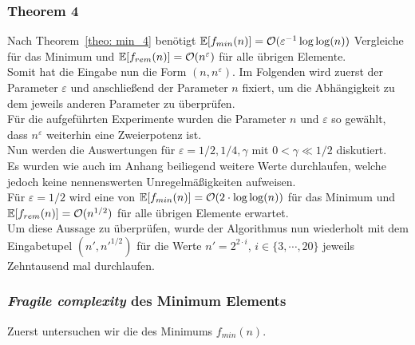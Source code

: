 \subsubsection{Theorem 4}		%

\noindent
Nach Theorem~\ref{theo: min_4} benötigt \Rm $\mathbb{E}[f_{min}(n)]=\mathcal{O}(\varepsilon^{-1}\log\log(n))$ Vergleiche für das Minimum und $\mathbb{E}[f_{rem}(n)]=\mathcal{O}(n^{\varepsilon})$ für alle übrigen Elemente.\\[.1cm]
Somit hat die Eingabe nun die Form $(n, n^{\varepsilon})$. Im Folgenden wird zuerst der Parameter $\varepsilon$ und anschließend der Parameter $n$ fixiert, um die Abhängigkeit zu dem jeweils anderen Parameter zu überprüfen.\\
Für die aufgeführten Experimente wurden die Parameter $n$ und $\varepsilon$ so gewählt, dass $n^{\varepsilon}$ weiterhin eine Zweierpotenz ist.\\[.15cm]

\noindent
Nun werden die Auswertungen für $\varepsilon=1/2, 1/4,\gamma$ mit $0<\gamma\ll 1/2$ diskutiert.\\
Es wurden wie auch im Anhang beiliegend weitere Werte durchlaufen, welche jedoch keine nennenswerten Unregelmäßigkeiten aufweisen.\\[.1cm]

\noindent
Für $\varepsilon=1/2$ wird eine \fg von $\mathbb{E}[f_{min}(n)]=\mathcal{O}(2\cdot\log\log(n))$ für das Minimum und $\mathbb{E}[f_{rem}(n)]=\mathcal{O}(n^{1/2})$ für alle übrigen Elemente erwartet.\\
Um diese Aussage zu überprüfen, wurde der Algorithmus nun wiederholt mit dem Eingabetupel $(n', n'^{1/2})$ für die Werte $n'=2^{2\cdot i}$, $i\in \{3,\cdots,20\}$ jeweils Zehntausend mal durchlaufen.
\subsubsection*{\textit{Fragile complexity} des Minimum Elements}
Zuerst untersuchen wir die \fg des Minimums $f_{min}(n)$. 

